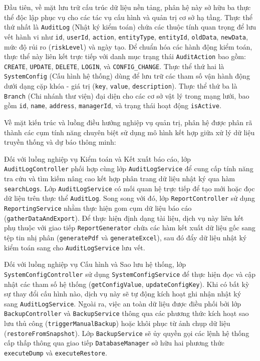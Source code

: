 Đầu tiên, về mặt lưu trữ cấu trúc dữ liệu nền tảng, phân hệ này sở hữu ba thực thể độc lập phục vụ cho các tác vụ cấu hình và quản trị cơ sở hạ tầng. Thực thể thứ nhất là \texttt{AuditLog} (Nhật ký kiểm toán) chứa các thuộc tính quan trọng để lưu vết hành vi như \texttt{id}, \texttt{userId}, \texttt{action}, \texttt{entityType}, \texttt{entityId}, \texttt{oldData}, \texttt{newData}, mức độ rủi ro (\texttt{riskLevel}) và ngày tạo. Để chuẩn hóa các hành động kiểm toán, thực thể này liên kết trực tiếp với danh mục trạng thái \texttt{AuditAction} bao gồm: \texttt{CREATE}, \texttt{UPDATE}, \texttt{DELETE}, \texttt{LOGIN}, và \texttt{CONFIG\_CHANGE}. Thực thể thứ hai là \texttt{SystemConfig} (Cấu hình hệ thống) dùng để lưu trữ các tham số vận hành động dưới dạng cặp khóa - giá trị (\texttt{key}, \texttt{value}, \texttt{description}). Thực thể thứ ba là \texttt{Branch} (Chi nhánh thư viện) đại diện cho các cơ sở vật lý trong mạng lưới, bao gồm \texttt{id}, \texttt{name}, \texttt{address}, \texttt{managerId}, và trạng thái hoạt động \texttt{isActive}.

Về mặt kiến trúc và luồng điều hướng nghiệp vụ quản trị, phân hệ được phân rã thành các cụm tính năng chuyên biệt sử dụng mô hình kết hợp giữa xử lý dữ liệu truyền thống và dự báo thông minh:

Đối với luồng nghiệp vụ Kiểm toán và Kết xuất báo cáo, lớp \texttt{AuditLogController} phối hợp cùng lớp \texttt{AuditLogService} để cung cấp tính năng tra cứu và tìm kiếm nâng cao kết hợp phân trang dữ liệu nhật ký qua hàm \texttt{searchLogs}. Lớp \texttt{AuditLogService} có mối quan hệ trực tiếp để tạo mới hoặc đọc dữ liệu trên thực thể \texttt{AuditLog}. Song song với đó, lớp \texttt{ReportController} sử dụng \texttt{ReportingService} nhằm thực hiện gom cụm dữ liệu báo cáo (\texttt{gatherDataAndExport}). Để thực hiện định dạng tài liệu, dịch vụ này liên kết phụ thuộc với giao tiếp \texttt{ReportGenerator} chứa các hàm kết xuất dữ liệu gốc sang tệp tin nhị phân (\texttt{generatePdf} và \texttt{generateExcel}), sau đó đẩy dữ liệu nhật ký kiểm toán sang cho \texttt{AuditLogService} lưu vết.

Đối với luồng nghiệp vụ Cấu hình và Sao lưu hệ thống, lớp \texttt{SystemConfigController} sử dụng \texttt{SystemConfigService} để thực hiện đọc và cập nhật các tham số hệ thống (\texttt{getConfigValue}, \texttt{updateConfigKey}). Khi có bất kỳ sự thay đổi cấu hình nào, dịch vụ này sẽ tự động kích hoạt ghi nhận nhật ký sang \texttt{AuditLogService}. Ngoài ra, việc an toàn dữ liệu được điều phối bởi lớp \texttt{BackupController} và \texttt{BackupService} thông qua các phương thức kích hoạt sao lưu thủ công (\texttt{triggerManualBackup}) hoặc khôi phục từ ảnh chụp dữ liệu (\texttt{restoreFromSnapshot}). Lớp \texttt{BackupService} sẽ ủy quyền gọi các lệnh hệ thống cấp thấp thông qua giao tiếp \texttt{DatabaseManager} sở hữu hai phương thức \texttt{executeDump} và \texttt{executeRestore}.

